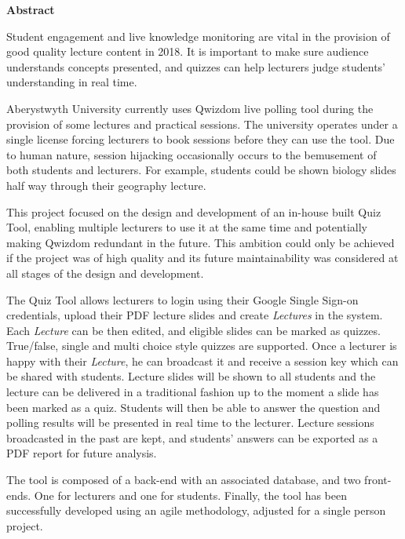 \thispagestyle{empty}

\begin{center}
    {\LARGE\bf Abstract}
\end{center}
Student engagement and live knowledge monitoring are vital in the provision of good quality
lecture content in 2018. It is important to make sure audience understands concepts presented,
and quizzes can help lecturers judge students' understanding in real time.

Aberystwyth University currently uses Qwizdom\cite{1} live polling tool during the provision
of some lectures and practical sessions. The university operates under a single license
forcing lecturers to book sessions before they can use the tool. Due to human nature,
session hijacking occasionally occurs to the bemusement of both students and lecturers.
For example, students could be shown biology slides half way through their geography
lecture.

This project focused on the design and development of an in-house built Quiz Tool,
enabling multiple lecturers to use it at the same time and potentially making Qwizdom
redundant in the future. This ambition could only be achieved if the project was of
high quality and its future maintainability was considered at all stages of the design
and development.

The Quiz Tool allows lecturers to login using their Google Single Sign-on\cite{2} credentials,
upload their PDF lecture slides and create \textit{Lectures} in the system.
Each \textit{Lecture} can be then edited, and eligible slides can be marked as quizzes.
True/false, single and multi choice style quizzes are supported. Once a lecturer is happy with their
\textit{Lecture}, he can broadcast it and receive a session key which can be
shared with students. Lecture slides will be shown to all students and the
lecture can be delivered in a traditional fashion up to the moment a slide has been marked as a quiz.
Students will then be able to answer
the question and polling results will be presented in real time to the lecturer.
Lecture sessions broadcasted in the past are kept, and students' answers can be exported
as a PDF report for future analysis.

The tool is composed of a back-end with an associated database, and two
front-ends. One for lecturers and one for students. Finally, the tool has been
successfully developed using an agile methodology, adjusted for a single person
project.
